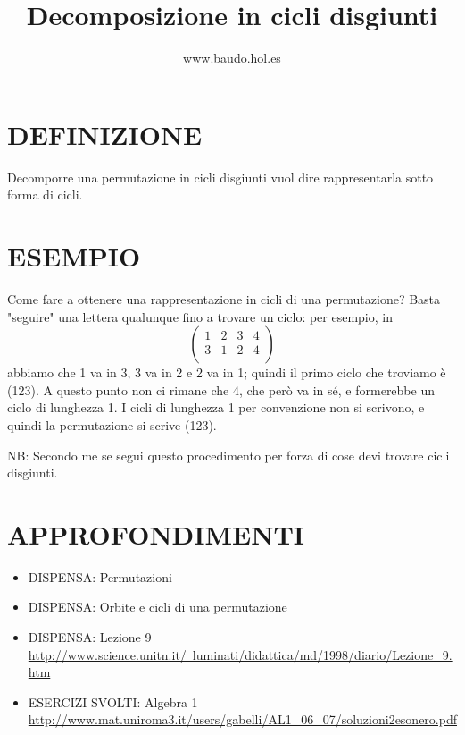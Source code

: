 \documentclass[a4paper,10pt]{article}
\title{Decomposizione in cicli disgiunti}
\author{www.baudo.hol.es}
\begin{document}
\maketitle

\section{DEFINIZIONE}
Decomporre una permutazione in cicli disgiunti vuol dire rappresentarla sotto forma di cicli.

\section{ESEMPIO}
Come fare a ottenere una rappresentazione in cicli di una permutazione? Basta "seguire" una lettera qualunque fino a trovare
un ciclo: per esempio, in 
\[
\left( \begin{array}{cccc} 1 & 2 & 3 & 4 \\ 3 & 1 & 2 & 4 \\ \end{array} \right) 
\]
abbiamo che 1 va in 3, 3 va in 2 e 2 va in 1; quindi il primo ciclo che troviamo è (123). A questo punto non ci rimane che 4,
che però va in sé, e formerebbe un ciclo di lunghezza 1. I cicli di lunghezza 1 per convenzione non si scrivono, e
quindi la permutazione si scrive (123).

NB: Secondo me se segui questo procedimento per forza di cose devi trovare cicli disgiunti.

\section{APPROFONDIMENTI}
\begin{itemize}
 \item DISPENSA: Permutazioni \cite{permutazione2}
 \item DISPENSA: Orbite e cicli di una permutazione \cite{permutazione4}
 \item DISPENSA: Lezione 9 \href{http://www.science.unitn.it/~luminati/didattica/md/1998/diario/Lezione_9.htm}{http://www.science.unitn.it/~luminati/didattica/md/1998/diario/Lezione_9.htm}
 \item ESERCIZI SVOLTI: Algebra 1 \href{http://www.mat.uniroma3.it/users/gabelli/AL1_06_07/soluzioni2esonero.pdf}{http://www.mat.uniroma3.it/users/gabelli/AL1_06_07/soluzioni2esonero.pdf}
\end{itemize}



\end{document}
